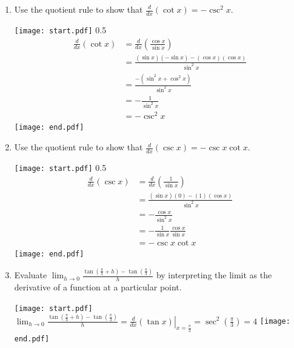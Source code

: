 \documentclass[12pt]{article}
\begin{document}
\begin{enumerate}
\item Use the quotient rule to show that $\frac{d}{dx}(\cot{x})=-\csc^2{x}$.

\texttt{[image: start.pdf]}
{{{0.5\linewidth}{
\begin{align*}
\frac{d}{dx}(\cot{x})&=\frac{d}{dx}\left(\frac{\cos{x}}{\sin{x}}\right)\\
&=\frac{(\sin{x})(-\sin{x})-(\cos{x})(\cos{x})}{\sin^2{x}}\\
&=\frac{-(\sin^2{x}+\cos^2{x})}{\sin^2{x}}\\
&=-\frac{1}{\sin^2{x}}\\
&=-\csc^2{x}
\end{align*}
}}}
\texttt{[image: end.pdf]}

\item Use the quotient rule to show that $\frac{d}{dx}(\csc{x})=-\csc{x}\cot{x}$.

\texttt{[image: start.pdf]}
{{{0.5\linewidth}{
\begin{align*}
\frac{d}{dx}(\csc{x})&=\frac{d}{dx}\left(\frac{1}{\sin{x}}\right)\\
&=\frac{(\sin{x})(0)-(1)(\cos{x})}{\sin^2{x}}\\
&=-\frac{\cos{x}}{\sin^2{x}}\\
&=-\frac{1}{\sin{x}}\frac{\cos{x}}{\sin{x}}\\
&=-\csc{x}\cot{x}
\end{align*}
}}}
\texttt{[image: end.pdf]}


\newpage

\item Evaluate $\lim_{h \rightarrow 0}{\frac{\tan{\left(\frac{\pi}{3}+h\right)}-\tan{\left(\frac{\pi}{3}\right)}}{h}}$ by interpreting the limit as the derivative of a function at a particular point.

\texttt{[image: start.pdf]}
{{$\lim_{h \rightarrow 0}{\frac{\tan{\left(\frac{\pi}{3}+h\right)}-\tan{\left(\frac{\pi}{3}\right)}}{h}}=\left.\frac{d}{dx}(\tan{x})\right|_{x=\frac{\pi}{3}}=\sec^2{\left(\frac{\pi}{3}\right)}=4$}}
\texttt{[image: end.pdf]}


\end{enumerate}

\end{document}
